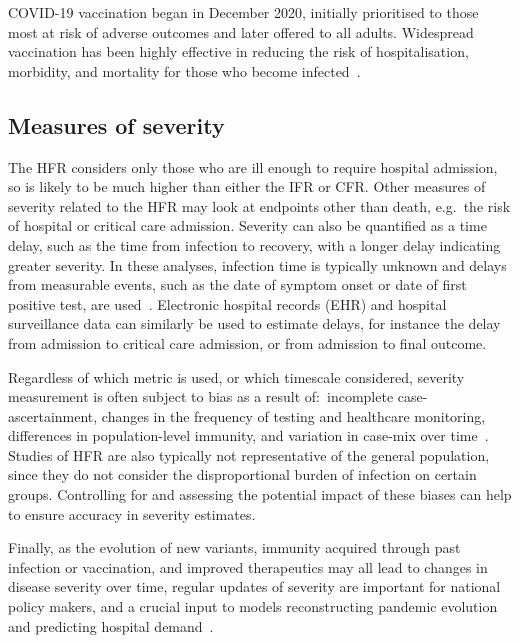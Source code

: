 COVID-19 vaccination began in December 2020, initially prioritised to those most at risk of adverse outcomes and later offered to all adults. Widespread vaccination has been highly effective in reducing the risk of hospitalisation, morbidity, and mortality for those who become infected~\parencite{Lopez_Bernal2021-gt,Public_Health_England2021-xs, Nyberg2022-jz}.

\subsection{Measures of severity}

The HFR considers only those who are ill enough to require hospital admission, so is likely to be much higher than either the IFR or CFR\@. Other measures of severity related to the HFR may look at endpoints other than death, e.g.\ the risk of hospital or critical care admission. Severity can also be quantified as a time delay, such as the time from infection to recovery, with a longer delay indicating greater severity. In these analyses, infection time is typically unknown and delays from measurable events, such as the date of symptom onset or date of first positive test, are used~\parencite{Nyberg2021-cr, Harrison2020-iw}. Electronic hospital records (EHR) and hospital surveillance data can similarly be used to estimate delays, for instance the delay from admission to critical care admission, or from admission to final outcome.

Regardless of which metric is used, or which timescale considered, severity measurement is often subject to bias as a result of:\ incomplete case-ascertainment, changes in the frequency of testing and healthcare monitoring, differences in population-level immunity, and variation in case-mix over time~\parencite{Bhattacharya2021-wq}. Studies of HFR are also typically not representative of the general population, since they do not consider the disproportional burden of infection on certain groups. Controlling for and assessing the potential impact of these biases can help to ensure accuracy in severity estimates.

Finally, as the evolution of new variants, immunity acquired through past infection or vaccination, and improved therapeutics may all lead to changes in disease severity over time, regular updates of severity are important for national policy makers, and a crucial input to models reconstructing pandemic evolution and predicting hospital demand~\parencite{Birrell2021-pu, Birrell2021-ou}.

